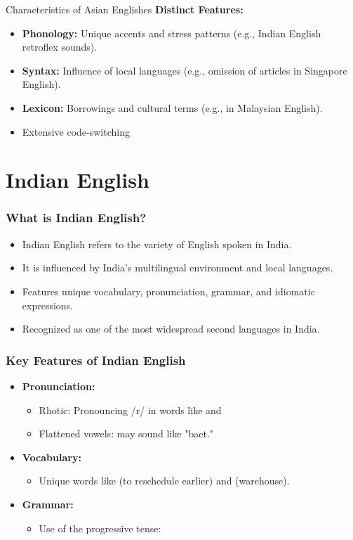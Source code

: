 \documentclass{beamer}
\begin{document}
\begin{frame}{Characteristics of Asian Englishes}
\textbf{Distinct Features:}
\begin{itemize}
    \item \textbf{Phonology:} Unique accents and stress patterns (e.g., Indian English retroflex sounds).
    \item \textbf{Syntax:} Influence of local languages (e.g., omission of articles in Singapore English).
    \item \textbf{Lexicon:} Borrowings and cultural terms (e.g.,  in Malaysian English).
    \item Extensive code-switching
\end{itemize}
\end{frame}

\section{Indian English}

\begin{frame}
\frametitle{What is Indian English?}
\begin{itemize}
    \item Indian English refers to the variety of English spoken in India.
    \item It is influenced by India's multilingual environment and local languages.
    \item Features unique vocabulary, pronunciation, grammar, and idiomatic expressions.
    \item Recognized as one of the most widespread second languages in India.
\end{itemize}
\end{frame}

\begin{frame}
\frametitle{Key Features of Indian English}
\begin{itemize}
    \item \textbf{Pronunciation:}
    \begin{itemize}
        \item Rhotic: Pronouncing /r/ in words like  and 
        \item Flattened vowels:  may sound like "baet."
    \end{itemize}
    \item \textbf{Vocabulary:}
    \begin{itemize}
        \item Unique words like  (to reschedule earlier) and  (warehouse).
    \end{itemize}
    \item \textbf{Grammar:}
    \begin{itemize}
        \item Use of the progressive tense: 
    \end{itemize}
\end{itemize}
\end{frame}
\end{document}
